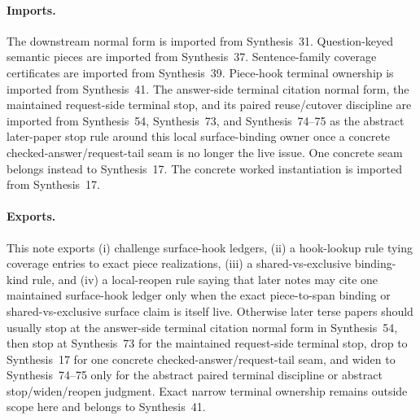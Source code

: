 \documentclass[11pt]{article}
\begin{document}
\paragraph{Imports.}
The downstream normal form is imported from Synthesis~31.\cite{series:downstreamnormalforms}
Question-keyed semantic pieces are imported from Synthesis~37.\cite{series:challengestops}
Sentence-family coverage certificates are imported from Synthesis~39.\cite{series:challengecoverage}
Piece-hook terminal ownership is imported from Synthesis~41.\cite{series:challengeterminalwitnesses}
The answer-side terminal citation normal form, the maintained request-side terminal stop, and its paired reuse/cutover discipline are imported from Synthesis~54, Synthesis~73, and Synthesis~74--75 as the abstract later-paper stop rule around this local surface-binding owner once a concrete checked-answer/request-tail seam is no longer the live issue. One concrete seam belongs instead to Synthesis~17.\cite{series:challengeanswerreviewmenus,series:publicrequestresponsepacketrefreshresponsepacketclosureverdicts,series:pairedterminalcitationdiscipline,series:pairedterminalcutoverrules,series:workedexample}
The concrete worked instantiation is imported from Synthesis~17.\cite{series:workedexample}
\paragraph{Exports.}
This note exports (i) challenge surface-hook ledgers, (ii) a hook-lookup rule tying coverage entries to exact piece realizations, (iii) a shared-vs-exclusive binding-kind rule, and (iv) a local-reopen rule saying that later notes may cite one maintained surface-hook ledger only when the exact piece-to-span binding or shared-vs-exclusive surface claim is itself live.
Otherwise later terse papers should usually stop at the answer-side terminal citation normal form in Synthesis~54, then stop at Synthesis~73 for the maintained request-side terminal stop, drop to Synthesis~17 for one concrete checked-answer/request-tail seam, and widen to Synthesis~74--75 only for the abstract paired terminal discipline or abstract stop/widen/reopen judgment. Exact narrow terminal ownership remains outside scope here and belongs to Synthesis~41.\cite{series:challengeterminalwitnesses,series:challengeanswerreviewmenus,series:publicrequestresponsepacketrefreshresponsepacketclosureverdicts,series:pairedterminalcitationdiscipline,series:pairedterminalcutoverrules,series:workedexample}
\end{document}
